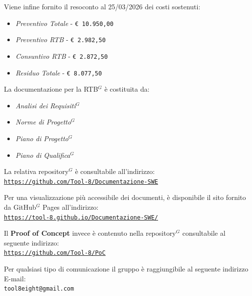 \documentclass[a4paper,10pt]{article}
\begin{document}
Viene infine fornito il resoconto al 25/03/2026 dei costi sostenuti:
\begin{itemize}
  \item \textit{Preventivo Totale} - \texttt{€ 10.950,00}
  \item \textit{Preventivo RTB} - \texttt{€ 2.982,50}
  \item \textit{Consuntivo RTB} - \texttt{€ 2.872,50}
  \item \textit{Residuo Totale} - \texttt{€ 8.077,50}
\end{itemize}

\vspace{1\baselineskip}

La documentazione per la RTB$^G$ è costituita da:
\begin{itemize}
  \item \textit{Analisi dei Requisiti$^G$}
  \item \textit{Norme di Progetto$^G$}
  \item \textit{Piano di Progetto$^G$}
  \item \textit{Piano di Qualifica$^G$}
\end{itemize}
La relativa repository$^G$ è consultabile all'indirizzo:\\
\href{https://github.com/Tool-8/Documentazione-SWE}{\underline{\texttt{https://github.com/Tool-8/Documentazione-SWE}}}

\vspace{1\baselineskip}

Per una visualizzazione più accessibile dei documenti, è disponibile il sito fornito da GitHub$^G$ Pages all'indirizzo:\\ \href{https://tool-8.github.io/Documentazione-SWE/}{\underline{\texttt{https://tool-8.github.io/Documentazione-SWE/}}}

\vspace{2\baselineskip}

Il \textbf{Proof of Concept} invece è contenuto nella repository$^G$ consultabile al seguente indirizzo:\\
\href{https://github.com/Tool-8/PoC}{\underline{\texttt{https://github.com/Tool-8/PoC}}}

\vspace{3\baselineskip}

Per qualsiasi tipo di comunicazione il gruppo è raggiungibile al seguente indirizzo E-mail:\\
\texttt{tool8eight@gmail.com}
\end{document}
